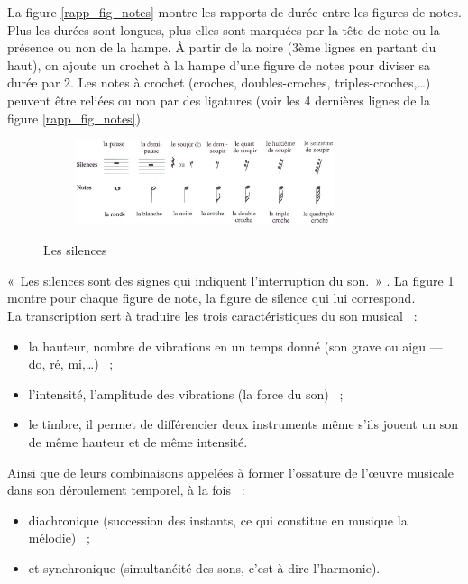La figure \ref{rapp_fig_notes} montre les rapports de durée entre les figures
de notes. Plus les durées sont longues, plus elles sont marquées par la tête de
note ou la présence ou non de la hampe. À partir de la noire (3ème lignes en
partant du haut), on ajoute un crochet à la hampe d’une figure de notes pour
diviser sa durée par 2. 
Les notes à crochet (croches, doubles-croches, triples-croches,…) 
peuvent être reliées ou non par des ligatures (voir les 4 dernières lignes de
la figure \ref{rapp_fig_notes}).\newpage
\begin{figure}[h]
	\centering
	\includegraphics[height=25mm, width=95mm]{
    z_images/3_methodes/0_notation_de_la_batterie/4_silences.png}
	\caption{Les silences}\cite{danhauser}
	\label{silences}
\end{figure}
«~Les silences sont des signes qui indiquent l’interruption du son.~»
\cite{danhauser}. La figure \ref{silences} montre pour chaque figure de note,
la figure de silence qui lui correspond.\\

La transcription sert à traduire les trois caractéristiques du son musical~ :
\begin{itemize}
	\item la hauteur, nombre de vibrations en un temps donné (son grave ou
        aigu — do, ré, mi,…)~ ;
	\item l’intensité, l’amplitude des vibrations (la force du son)~ ;
	\item le timbre, il permet de différencier deux instruments même s’ils
        jouent un son de même hauteur et de même intensité.
\end{itemize}

Ainsi que de leurs combinaisons appelées à former l’ossature de l’œuvre
musicale dans son déroulement temporel, à la fois~ :
\begin{itemize}
	\item diachronique (succession des instants, ce qui constitue en musique la
        mélodie)~ ;
	\item et synchronique (simultanéité des sons, c’est-à-dire l’harmonie).\\
\end{itemize}


